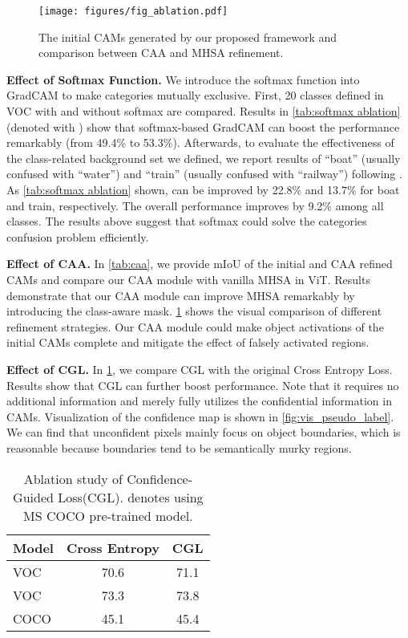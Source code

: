 \documentclass[10pt,twocolumn,letterpaper]{article}
\begin{document}
\begin{figure}[t]
  \centering
   \texttt{[image: figures/fig\_ablation.pdf]}

   \caption{The initial CAMs generated by our proposed framework and comparison between CAA and MHSA refinement.
   }
   \vspace{-2mm}
   \label{fig:ablation_caa}
\end{figure}

\textbf{Effect of Softmax Function.} We introduce the softmax function into GradCAM to make categories mutually exclusive. First, 20 classes defined in VOC with and without softmax are compared. Results in \cref{tab:softmax ablation} (denoted with ) show that softmax-based GradCAM can boost the performance remarkably (from 49.4\% to 53.3\%). Afterwards, to evaluate the effectiveness of the class-related background set we defined, we report results of ``boat'' (usually confused with ``water'') and ``train'' (usually confused with ``railway'') following \cite{Xie_2022_CLIMS,Lee2021EPS}. As \cref{tab:softmax ablation} shown,  can be improved by 22.8\% and 13.7\% for boat and train, respectively. The overall performance improves by 9.2\% among all classes. The results above suggest that softmax could solve the categories confusion problem efficiently.



\textbf{Effect of CAA.} In \cref{tab:caa}, we provide mIoU of the initial and CAA refined CAMs and compare our CAA module with vanilla MHSA in ViT. Results demonstrate that our CAA module can improve MHSA remarkably by introducing the class-aware mask. 
\cref{fig:ablation_caa} shows the visual comparison of different refinement strategies. Our CAA module could make object activations of the initial CAMs complete and mitigate the effect of falsely activated regions.

\textbf{Effect of CGL.} 
In \cref{tab:cgl ablation}, we compare CGL with the original Cross Entropy Loss. Results show that CGL can further boost performance. Note that it requires no additional information and merely fully utilizes the confidential information in CAMs. Visualization of the confidence map is shown in \cref{fig:vis_pseudo_label}. We can find that unconfident pixels mainly focus on object boundaries, which is reasonable because boundaries tend to be semantically murky regions.

\begin{table}
  \centering
  \begin{tabular}{lcc}
    \toprule
    Model  & Cross Entropy & CGL \\
    \midrule
    VOC  & 70.6    & 71.1   \\
    VOC      & 73.3  & 73.8      \\
    COCO    & 45.1 & 45.4       \\
    \bottomrule
  \end{tabular}
  \caption{Ablation study of Confidence-Guided Loss(CGL). denotes using MS COCO pre-trained model.}
  \label{tab:cgl ablation}
\end{table}
\end{document}
